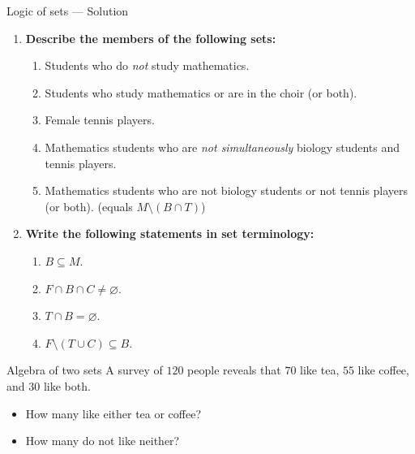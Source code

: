 \documentclass[9pt]{beamer}
\begin{document}
\begin{frame}{Logic of sets — Solution}
\begin{enumerate}[leftmargin=0.5cm, label=\textbf{(\alph*)}, rightmargin=0.2cm]
  \item \textbf{Describe the members of the following sets:}
  \begin{enumerate}[leftmargin=0.6cm, label=(\roman*), rightmargin=0.2cm]
    \item Students who do \emph{not} study mathematics.
    \item Students who study mathematics or are in the choir (or both).
    \item Female tennis players.
    \item Mathematics students who are \emph{not simultaneously} biology students and tennis players.
    \item Mathematics students who are not biology students or not tennis players (or both). \hfill (equals $M \setminus (B \cap T)$)
  \end{enumerate}

  \item \textbf{Write the following statements in set terminology:}
  \begin{enumerate}[leftmargin=0.6cm, label=(\roman*), rightmargin=0.2cm]
    \item $B \subseteq M$.
    \item $F \cap B \cap C \neq \varnothing$.
    \item $T \cap B = \varnothing$.
    \item $F \setminus (T \cup C) \subseteq B$.
  \end{enumerate}
\end{enumerate}
\end{frame}

\begin{frame}{Algebra of two sets}
    A survey of $120$ people reveals that $70$ like tea, $55$ like coffee, and $30$ like both. 
    \begin{itemize}[leftmargin = 0.5cm, label = $\bullet$, rightmargin = 0.2cm]
        \item How many like either tea or coffee?
        \item How many do not like neither?
    \end{itemize}
\end{frame}
\end{document}

